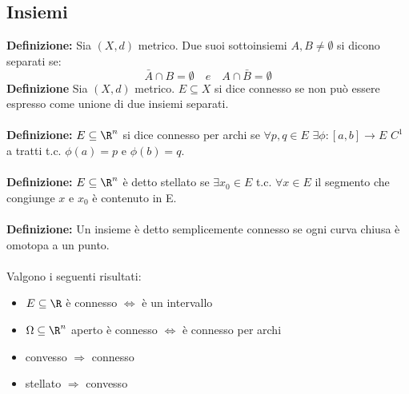 \documentclass{article}
\begin{document}
\subsection{Insiemi}
\textbf{Definizione:} Sia $(X,d)$ metrico. Due suoi sottoinsiemi $A,B\neq\emptyset$ si dicono separati se:
$$ \bar{A}\cap B=\emptyset\quad e\quad A\cap\bar{B}=\emptyset $$
\textbf{Definizione} Sia $(X,d)$ metrico. $E\subseteq X$ si dice connesso se non può essere espresso come unione di due insiemi separati.\\\\
\textbf{Definizione:} $E\subseteq\R^n$ si dice connesso per archi se $\forall p,q\in E$ $\exists\phi:[a,b]\rightarrow E$ $C^1$ a tratti t.c. $\phi(a)=p$ e $\phi(b)=q$.\\\\
\textbf{Definizione:} $E\subseteq\R^n$ è detto stellato se $\exists x_0\in E$ t.c. $\forall x\in E$ il segmento che congiunge $x$ e $x_0$ è contenuto in E.\\\\
\textbf{Definizione:} Un insieme è detto semplicemente connesso se ogni curva chiusa è omotopa a un punto.\\\\
Valgono i seguenti risultati:
\begin{itemize}
    \item $E\subseteq\R$ è connesso $\Leftrightarrow$ è un intervallo
    \item $\Omega\subseteq\R^n$ aperto è connesso $\Leftrightarrow$ è connesso per archi
    \item convesso $\Rightarrow$ connesso
    \item stellato $\Rightarrow$ convesso
\end{itemize}
\end{document}

